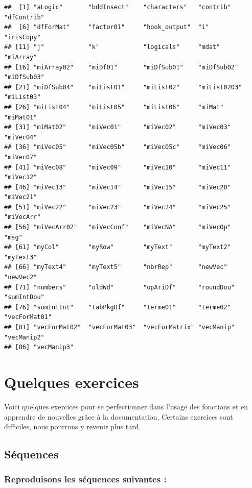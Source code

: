 \documentclass[
]{book}
\begin{document}
\begin{verbatim}
##  [1] "aLogic"       "bddInsect"    "characters"   "contrib"      "dfContrib"   
##  [6] "dfForMat"     "factor01"     "hook_output"  "i"            "irisCopy"    
## [11] "j"            "k"            "logicals"     "mdat"         "miArray"     
## [16] "miArray02"    "miDf01"       "miDfSub01"    "miDfSub02"    "miDfSub03"   
## [21] "miDfSub04"    "miList01"     "miList02"     "miList0203"   "miList03"    
## [26] "miList04"     "miList05"     "miList06"     "miMat"        "miMat01"     
## [31] "miMat02"      "miVec01"      "miVec02"      "miVec03"      "miVec04"     
## [36] "miVec05"      "miVec05b"     "miVec05c"     "miVec06"      "miVec07"     
## [41] "miVec08"      "miVec09"      "miVec10"      "miVec11"      "miVec12"     
## [46] "miVec13"      "miVec14"      "miVec15"      "miVec20"      "miVec21"     
## [51] "miVec22"      "miVec23"      "miVec24"      "miVec25"      "miVecArr"    
## [56] "miVecArr02"   "miVecConf"    "miVecNA"      "miVecOp"      "msg"         
## [61] "myCol"        "myRow"        "myText"       "myText2"      "myText3"     
## [66] "myText4"      "myText5"      "nbrRep"       "newVec"       "newVec2"     
## [71] "numbers"      "oldWd"        "opAriDf"      "roundDou"     "sumIntDou"   
## [76] "sumIntInt"    "tabPkgDf"     "terme01"      "terme02"      "vecForMat01" 
## [81] "vecForMat02"  "vecForMat03"  "vecForMatrix" "vecManip"     "vecManip2"   
## [86] "vecManip3"
\end{verbatim}

\hypertarget{quelques-exercices}{%
\section{Quelques exercices}\label{quelques-exercices}}

Voici quelques exercices pour se perfectionner dans l'usage des fonctions et en apprendre de nouvelles grâce à la documentation. Certains exercices sont difficiles, nous pourrons y revenir plus tard.

\hypertarget{suxe9quences}{%
\subsection{Séquences}\label{suxe9quences}}

\hypertarget{reproduisons-les-suxe9quences-suivantes}{%
\subsubsection{Reproduisons les séquences suivantes :}\label{reproduisons-les-suxe9quences-suivantes}}
\end{document}
